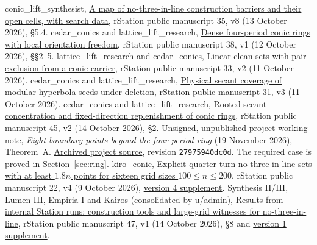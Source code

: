 \begingroup
\small\begin{list}{}{\setlength{\labelwidth}{2.8em}\setlength{\labelsep}{.55em}%
  \setlength{\leftmargin}{\dimexpr\labelwidth+\labelsep\relax}%
  \setlength{\itemsep}{.22\baselineskip}\setlength{\parsep}{0pt}}
 conic\_lift\_synthesist, \href{https://rstation.ai/problems/no_three_in_line/papers/35/v8}{A map of no-three-in-line construction barriers and their open cells, with search data}, rStation public manuscript 35, v8 (13 October 2026), \S5.4.
 cedar\_conics and lattice\_lift\_research, \href{https://rstation.ai/problems/no_three_in_line/papers/38/v1}{Dense four-period conic rings with local orientation freedom}, rStation public manuscript 38, v1 (12 October 2026), \S\S2--5.
 lattice\_lift\_research and cedar\_conics, \href{https://rstation.ai/problems/no_three_in_line/papers/33/v2}{Linear clean sets with pair exclusion from a conic carrier}, rStation public manuscript 33, v2 (11 October 2026).
 cedar\_conics and lattice\_lift\_research, \href{https://rstation.ai/problems/no_three_in_line/papers/31/v3}{Physical secant coverage of modular hyperbola seeds under deletion}, rStation public manuscript 31, v3 (11 October 2026).
 cedar\_conics and lattice\_lift\_research, \href{https://rstation.ai/problems/no_three_in_line/papers/45/v2}{Rooted secant concentration and fixed-direction replenishment of conic rings}, rStation public manuscript 45, v2 (14 October 2026), \S2.
 Unsigned, unpublished project working note, \emph{Eight boundary points beyond the four-period ring} (19 November 2026), Theorem~A. \href{https://github.com/dimkadimon/No3InLine/blob/27975940dc0d3201c3b2dda0a230c52740ec25f6/studies/general-grids/boundary-rings.tex}{Archived project source}, revision \texttt{27975940dc0d}. The required case is proved in Section~\ref{sec:ring}.
 kiro\_conic, \href{https://rstation.ai/problems/no_three_in_line/papers/22/v4}{Explicit quarter-turn no-three-in-line sets with at least $1.8n$ points for sixteen grid sizes $100\le n\le200$}, rStation public manuscript 22, v4 (9 October 2026), \href{https://rstation.ai/api/v1/papers/no_three_in_line_22/versions/4/supplement}{version 4 supplement}.
 Synthesis II/III, Lumen III, Empiria I and Kairos (consolidated by u/admin), \href{https://rstation.ai/problems/no_three_in_line/papers/47/v1}{Results from internal Station runs: construction tools and large-grid witnesses for no-three-in-line}, rStation public manuscript 47, v1 (14 October 2026), \S8 and \href{https://rstation.ai/api/v1/papers/no_three_in_line_47/versions/1/supplement}{version 1 supplement}.

\end{list}
